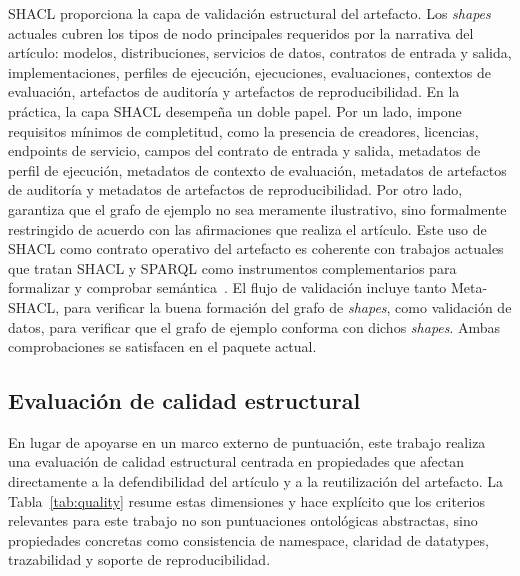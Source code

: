 \documentclass[11pt,a4paper]{article}
\begin{document}
SHACL proporciona la capa de validación estructural del artefacto. Los \emph{shapes} actuales cubren los tipos de nodo principales requeridos por la narrativa del artículo: modelos, distribuciones, servicios de datos, contratos de entrada y salida, implementaciones, perfiles de ejecución, ejecuciones, evaluaciones, contextos de evaluación, artefactos de auditoría y artefactos de reproducibilidad. En la práctica, la capa SHACL desempeña un doble papel. Por un lado, impone requisitos mínimos de completitud, como la presencia de creadores, licencias, endpoints de servicio, campos del contrato de entrada y salida, metadatos de perfil de ejecución, metadatos de contexto de evaluación, metadatos de artefactos de auditoría y metadatos de artefactos de reproducibilidad. Por otro lado, garantiza que el grafo de ejemplo no sea meramente ilustrativo, sino formalmente restringido de acuerdo con las afirmaciones que realiza el artículo. Este uso de SHACL como contrato operativo del artefacto es coherente con trabajos actuales que tratan SHACL y SPARQL como instrumentos complementarios para formalizar y comprobar semántica~\cite{shacl,ferranti,robaldo}. El flujo de validación incluye tanto Meta-SHACL, para verificar la buena formación del grafo de \emph{shapes}, como validación de datos, para verificar que el grafo de ejemplo conforma con dichos \emph{shapes}. Ambas comprobaciones se satisfacen en el paquete actual.

\subsection{Evaluación de calidad estructural}

En lugar de apoyarse en un marco externo de puntuación, este trabajo realiza una evaluación de calidad estructural centrada en propiedades que afectan directamente a la defendibilidad del artículo y a la reutilización del artefacto. La Tabla~\ref{tab:quality} resume estas dimensiones y hace explícito que los criterios relevantes para este trabajo no son puntuaciones ontológicas abstractas, sino propiedades concretas como consistencia de namespace, claridad de datatypes, trazabilidad y soporte de reproducibilidad.
\end{document}
